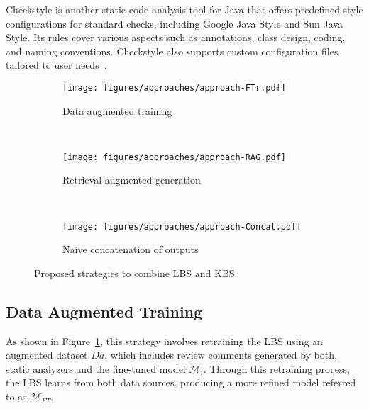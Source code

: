 Checkstyle is another static code analysis tool for Java that offers predefined style configurations for standard checks, including Google Java Style and Sun Java Style. Its rules cover various aspects such as annotations, class design, coding, and naming conventions. Checkstyle also supports custom configuration files tailored to user needs~\cite{hovemeyer2004finding, balachandran2013reducing, oskouei2018comparing, lenarduzzi2023critical}.




\begin{figure}[!htbp]
\begin{subfigure}{1\linewidth}
  \centering
  \texttt{[image: figures/approaches/approach-FTr.pdf]}
  \caption{Data augmented training}
  \label{fig:approach1}
\end{subfigure}
\\ \vspace{10pt}
\begin{subfigure}{1\linewidth}
  \centering
  \texttt{[image: figures/approaches/approach-RAG.pdf]}
  \caption{Retrieval augmented generation}
  \label{fig:approach2}
\end{subfigure}
\\ \vspace{10pt}
\begin{subfigure}{1\linewidth}
  \centering
  \texttt{[image: figures/approaches/approach-Concat.pdf]}
  \caption{Naive concatenation of outputs}
  \label{fig:approach3}
\end{subfigure}
\caption{Proposed strategies to combine LBS and KBS}
\label{fig:approaches}
\end{figure}





\subsection{Data Augmented Training}

As shown in Figure~\ref{fig:approach1}, this strategy involves retraining the LBS using an augmented dataset \({Da}\), which includes review comments generated by both, static analyzers and the fine-tuned model \(\mathcal{M}_i\). Through this retraining process, the LBS learns from both data sources, producing a more refined model referred to as \(\mathcal{M}_{FT}\).


